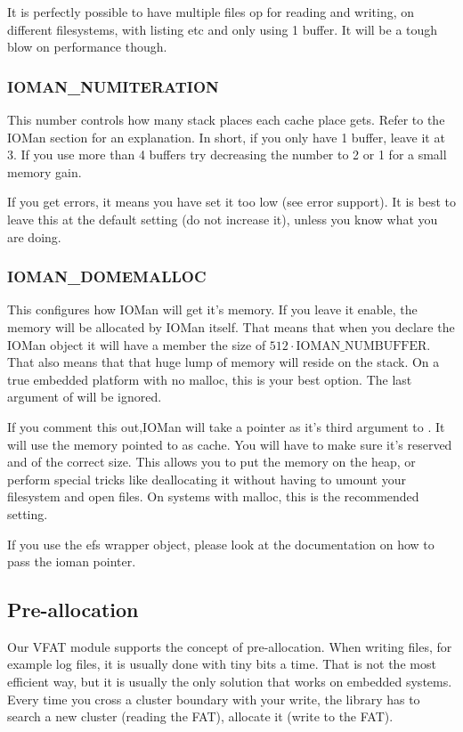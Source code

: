 It is perfectly possible to have multiple files op for reading and writing, on different
filesystems, with listing etc and only using 1 buffer. It will be a tough blow on
performance though.
\subsubsection*{IOMAN\_NUMITERATION}
This number controls how many stack places each cache place gets. Refer to the IOMan 
section for an explanation. In short, if you only have 1 buffer, leave it at 3. If you
use more than 4 buffers try decreasing the number to 2 or 1 for a small memory gain.

If you get errors, it means you have set it too low (see error support). It is best
to leave this at the default setting (do not increase it), unless you know what you
are doing.
\subsubsection*{IOMAN\_DOMEMALLOC}
This configures how IOMan will get it's memory. If you leave it enable, the memory 
will be allocated by IOMan itself. That means that when you declare the IOMan object
it will have a member the size of $512 \cdot \mathrm{IOMAN\_NUMBUFFER}$. 
That also means that that huge lump of memory will reside on the stack. On a true embedded platform with no malloc, this is your best option.
The last argument of  will be ignored.

If you comment this out,IOMan will take a  pointer as it's third
argument to . It will use the memory pointed to as cache.
You will have to make sure it's reserved and of the correct size.
This allows you to put the memory on the heap, or perform special tricks like
deallocating it without having to umount your filesystem and open files.
On systems with malloc, this is the recommended setting. 

If you use the efs wrapper object, please look at the  documentation
on how to pass the ioman pointer.

\subsection{Pre-allocation}
Our VFAT module supports the concept of pre-allocation. When writing files, for
example log files, it is usually done with tiny bits a time. That is not the
most efficient way, but it is usually the only solution that works on embedded
systems. Every time you cross a cluster boundary with your write, the library 
has to search a new cluster (reading the FAT), allocate it (write to the FAT).

